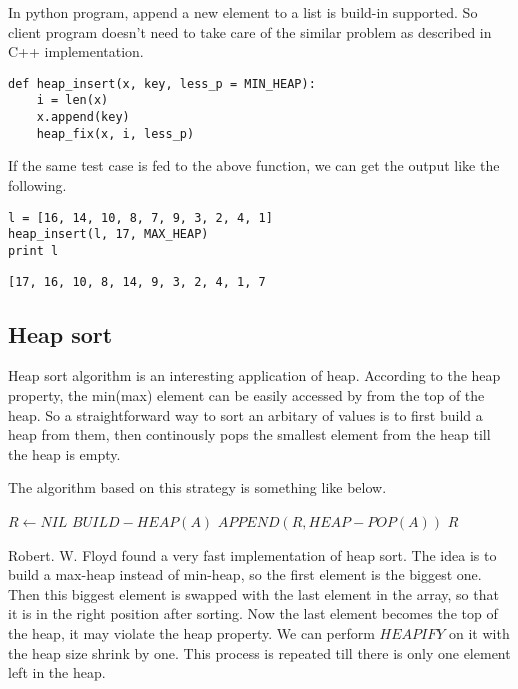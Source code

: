 \documentclass{article}
\begin{document}
In python program, append a new element to a list is build-in
supported. So client program doesn't need to take care of the
similar problem as described in C++ implementation.

\lstset{language=Python}
\begin{lstlisting}
def heap_insert(x, key, less_p = MIN_HEAP):
    i = len(x)
    x.append(key)
    heap_fix(x, i, less_p)
\end{lstlisting}

If the same test case is fed to the above function, we can 
get the output like the following.

\begin{lstlisting}
l = [16, 14, 10, 8, 7, 9, 3, 2, 4, 1]
heap_insert(l, 17, MAX_HEAP)
print l
\end{lstlisting}

\begin{verbatim}
[17, 16, 10, 8, 14, 9, 3, 2, 4, 1, 7
\end{verbatim}

\subsection{Heap sort}

Heap sort algorithm is an interesting application of heap. According
to the heap property, the min(max) element can be easily accessed
by from the top of the heap. So a straightforward way to sort an
arbitary of values is to first build a heap from them, then continously
pops the smallest element from the heap till the heap is empty.

The algorithm based on this strategy is something like below.

\begin{algorithmic}[1]
  \State $R \gets NIL$
  \State $BUILD-HEAP(A)$
    \State $APPEND(R, HEAP-POP(A))$
  \EndWhile
  \State \Return $R$
\EndFunction
\end{algorithmic}

Robert. W. Floyd found a very fast implementation of heap sort.
The idea is to build a max-heap instead of min-heap, so the first
element is the biggest one. Then this biggest element is swapped
with the last element in the array, so that it is in the right
position after sorting. Now the last element becomes the top
of the heap, it may violate the heap property. We can perform
$HEAPIFY$ on it with the heap size shrink by one. This process
is repeated till there is only one element left in the heap.
\end{document}
